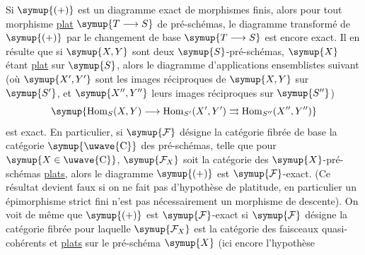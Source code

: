  Si $\symup{(+)}$ est un diagramme exact de morphismes finis, alors pour
tout morphisme \uline{plat} $\symup{T\longrightarrow S}$ de pré-schémas, le diagramme transformé
de $\symup{(+)}$ par le changement de base $\symup{T\longrightarrow S}$ est encore exact. Il en
résulte que si $\symup{X,Y}$ sont deux $\symup{S}$-pré-schémas, $\symup{X}$ étant \uline{plat} sur $\symup{S}$, alors le
diagramme d'applications ensemblistes suivant (où $\symup{X',Y'}$ sont les images
réciproques de $\symup{X,Y}$ sur $\symup{S'}$, et $\symup{X'',Y''}$ leurs images réciproques sur $\symup{S''}$)
\[
  \symup{\operatorname{Hom}_S(X,Y)\longrightarrow
  \operatorname{Hom}_{S'}(X',Y')
  \rightrightarrows
  \operatorname{Hom}_{S''}(X'',Y'')}
\]
est exact. En particulier, si $\symup{\mathcal F}$ désigne la catégorie fibrée de base
la catégorie $\symup{\text{\uwave{C}}}$ des pré-schémas, telle que pour $\symup{X\in\text{\uwave{C}}}$,
$\symup{\mathcal F_X}$ soit la catégorie des $\symup{X}$-pré-schémas \uline{plats}, alors le diagramme
$\symup{(+)}$ est $\symup{\mathcal F}$-exact. (Ce résultat devient faux si on ne fait pas
d'hypothèse de platitude, en particulier un épimorphisme strict fini n'est pas
nécessairement un morphisme de descente). On voit de même que $\symup{(+)}$ est
$\symup{\mathcal F}$-exact si $\symup{\mathcal F}$ désigne la catégorie fibrée pour laquelle
$\symup{\mathcal F_X}$ est la catégorie des faisceaux quasi-cohérents et \uline{plats} sur le
pré-schéma $\symup{X}$ (ici encore l'hypothèse

